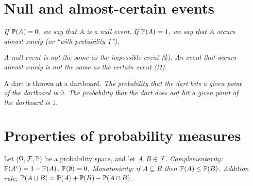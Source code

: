 \section{Null and almost-certain events}

\begin{definition}
\ben
\it If $\mathbb{P}(A)=0$, we say that $A$ is a \emph{null event}.
\it If $\mathbb{P}(A)=1$, we say that $A$ occurs \emph{almost surely} (or ``\emph{with probability 1}'').
\een
\end{definition}

\begin{remark}
\bit
\it A null event is not the same as the impossible event ($\emptyset$). 
\it An event that occurs almost surely is not the same as the certain event ($\Omega$).
\eit
\end{remark}

\begin{example}
A dart is thrown at a dartboard.
\bit
\it The probability that the dart hits a given point of the dartboard is $0$.
\it The probability that the dart does not hit a given point of the dartboard is $1$.
\eit
\end{example}

\section{Properties of probability measures}

\begin{theorem}\label{thm:properties_of_probability_measures}
Let $(\Omega,\mathcal{F},\mathbb{P})$ be a probability space, and let $A,B\in\mathcal{F}$. 
\ben
\it Complementarity: $\mathbb{P}(A^c) = 1 - \mathbb{P}(A)$.
\it $\mathbb{P}(\emptyset) = 0$,
\it Monotonicity: if $A\subseteq B$ then $\mathbb{P}(A)\leq \mathbb{P}(B)$.
\it Addition rule: $\mathbb{P}(A\cup B) = \mathbb{P}(A) + \mathbb{P}(B) - \mathbb{P}(A\cap B)$.
\een
\end{theorem}

